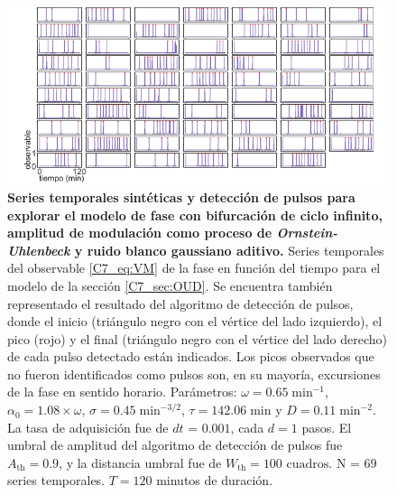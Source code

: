 \documentclass[./main.tex]{subfiles}
\begin{document}
\begin{subappendices}
 
\begin{figure}
    \centering
    \includegraphics[width=1\columnwidth]{figures/chapter7/C7_OUD_traces_for_evaluation_VM.pdf} 
    \caption{\textbf{Series temporales sintéticas y detección de pulsos para explorar el modelo de fase con bifurcación de ciclo infinito, amplitud de modulación como proceso de \textit{Ornstein-Uhlenbeck} y ruido blanco gaussiano aditivo.} Series temporales del observable \ref{C7_eq:VM} de la fase en función del tiempo para el modelo de la sección \ref{C7_sec:OUD}. Se encuentra también representado el resultado del algoritmo de detección de pulsos, donde el inicio (triángulo negro con el vértice del lado izquierdo), el pico (rojo) y el final (triángulo negro con el vértice del lado derecho) de cada pulso detectado están indicados. Los picos observados que no fueron identificados como pulsos son, en su mayoría, excursiones de la fase en sentido horario. Parámetros: $\omega = 0.65 \;\text{min}^{-1}$, $\alpha_0 = 1.08 \times \omega$, $ \sigma = 0.45 \;\text{min}^{-3/2}$, $\tau = 142.06 \; \text{min} $ y $D = 0.11 \;\text{min}^{-2}$. La tasa de adquisición fue de $dt$ = $0.001$, cada $d = 1$ pasos. El umbral de amplitud del algoritmo de detección de pulsos fue $A_{\text{th}} = 0.9$, y la distancia umbral fue de $W_{\text{th}} = 100\text{ cuadros}$. N = $69$ series temporales. $T = 120$ minutos de duración.}
    \label{C7_fig:OUD_traces_VM}
\end{figure}


\end{subappendices}
\end{document}

